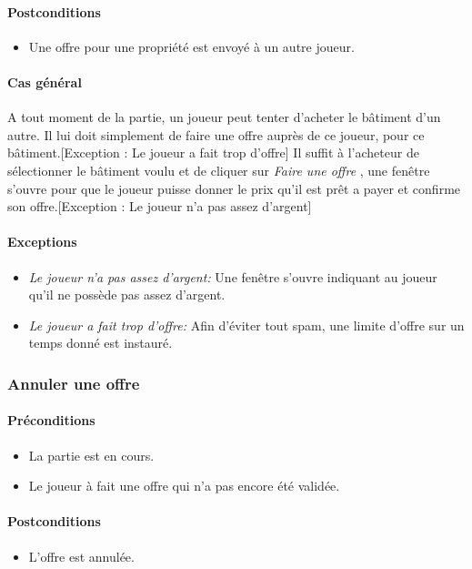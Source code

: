 \documentclass[a4paper,11pt]{report}
\begin{document}
\paragraph{Postconditions}
\begin{itemize}
 \item Une offre pour une propriété est envoyé à un autre joueur.
\end{itemize}
\paragraph{Cas général}
A tout moment de la partie, un joueur peut tenter d'acheter le bâtiment d'un autre. Il lui doit simplement de faire une offre auprès de ce joueur, pour ce bâtiment.[Exception : Le joueur a fait trop d'offre] Il suffit à l'acheteur de sélectionner le bâtiment voulu et de cliquer sur \og \textit{Faire une offre} \fg, une fenêtre s'ouvre pour que le joueur puisse donner le prix qu'il est prêt a payer et confirme son offre.[Exception : Le joueur n'a pas assez d'argent] 
\paragraph{Exceptions}
\begin{itemize}
 \item \textit{Le joueur n'a pas assez d'argent:} Une fenêtre s'ouvre indiquant au joueur qu'il ne possède pas assez d'argent.
 \item \textit{Le joueur a fait trop d'offre:} Afin d'éviter tout spam, une limite d'offre sur un temps donné est instauré.
\end{itemize}
\subsubsection{Annuler une offre}
\paragraph{Préconditions}
\begin{itemize}
 \item La partie est en cours.
 \item Le joueur à fait une offre qui n'a pas encore été validée.
\end{itemize}
\paragraph{Postconditions}
\begin{itemize}
 \item L'offre est annulée.
\end{itemize}
\end{document}
